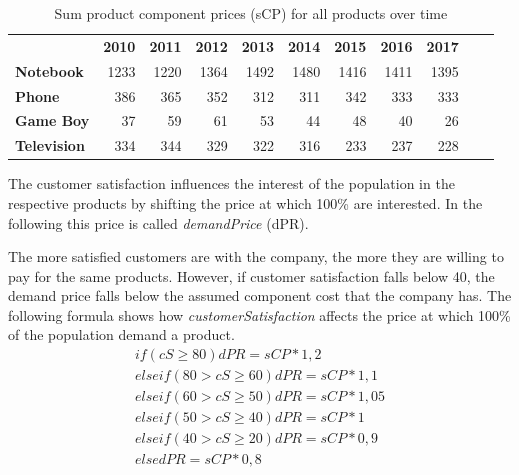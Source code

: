 \begin{table}[ht]
\begin{tabular}{|l|r|r|r|r|r|r|r|r|r|r|}
    \hline
                & \textbf{2010}  & \textbf{2011}  & \textbf{2012}  & \textbf{2013}  & \textbf{2014}  & \textbf{2015}  & \textbf{2016}  & \textbf{2017}  &  &\\
    \textbf{Notebook}    & 1233  & 1220  & 1364  & 1492  & 1480  & 1416  & 1411  & 1395  &  &\\   
    \textbf{Phone}       & 386   & 365   & 352   & 312   & 311   & 342   & 333   & 333   &  &\\ 
    \textbf{Game Boy}    & 37    & 59    & 61    & 53    & 44    & 48    & 40    & 26    & & \\  
    \textbf{Television}  & 334   & 344   & 329   & 322   & 316   & 233   & 237   & 228   &  &\\ 
    \hline
    \end{tabular}
    \caption{Sum product component prices (sCP) for all products over time}
    \label{sum_product_component_prices}
\end{table}
 
The customer satisfaction influences the interest of the population in the respective products by shifting the price at which 100\% are interested. In the following this price is called \textit{demandPrice} (\gls{dPR}).
 
The more satisfied customers are with the company, the more they are willing to pay for the same products. However, if customer satisfaction falls below 40, the demand price falls below the assumed component cost that the company has. The following formula shows how \textit{customerSatisfaction} affects the price at which 100\% of the population demand a product.
\begin{equation}
\label{func:demandPrice}
\begin{aligned}
if ( cS \geq 80 ) { dPR = sCP * 1,2 } \\
elseif ( 80 > cS \geq 60 ){ dPR = sCP * 1,1 } \\
elseif ( 60 > cS \geq 50 ) { dPR = sCP * 1,05 } \\
elseif ( 50 > cS \geq 40 ) { dPR = sCP * 1 } \\
elseif ( 40 > cS \geq 20 ) { dPR = sCP * 0,9 } \\
else { dPR = sCP * 0,8 }  
\end{aligned}
\end{equation}

